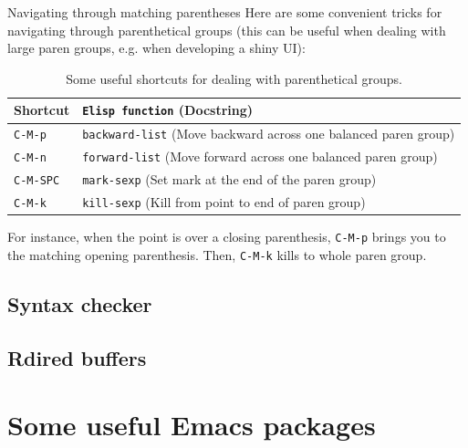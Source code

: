 \documentclass[presentation]{beamer}
\begin{document}
\begin{frame}[label={sec:orge6d1832},fragile]{Navigating through matching parentheses}
 Here are some convenient tricks for navigating through parenthetical groups (this can be useful when dealing with large paren groups, e.g. when developing a shiny UI):

\small

\begin{table}[htbp]
\centering
\begin{tabular}{ll}
\hline
Shortcut & \texttt{Elisp function} (Docstring)\\
\hline
\texttt{C-M-p} & \texttt{backward-list} (Move backward across one balanced paren group)\\
\texttt{C-M-n} & \texttt{forward-list} (Move forward across one balanced paren group)\\
\texttt{C-M-SPC} & \texttt{mark-sexp} (Set mark at the end of the paren group)\\
\texttt{C-M-k} & \texttt{kill-sexp} (Kill from point to end of paren group)\\
\hline
\end{tabular}
\caption{Some useful shortcuts for dealing with parenthetical groups.}

\end{table}

\normalsize

For instance, when the point is over a closing parenthesis, \texttt{C-M-p} brings you to the matching opening parenthesis. Then, \texttt{C-M-k} kills to whole paren group.
\end{frame}

\subsection{Syntax checker}
\label{sec:org6e4be90}
\subsection{Rdired buffers}
\label{sec:orgfc16aa3}

\section{Some useful Emacs packages}
\label{sec:orgb6965dc}
\end{document}
